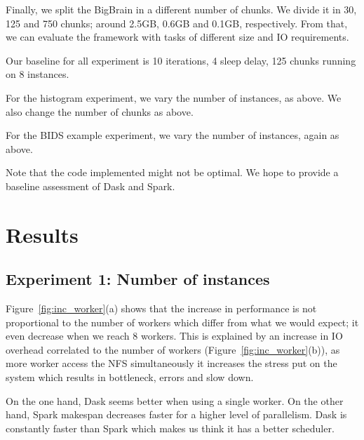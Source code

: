 \documentclass[conference]{IEEEtran}
\begin{document}
Finally, we split the BigBrain in a different number of chunks. We divide it in 30,
125 and 750 chunks; around 2.5GB, 0.6GB and 0.1GB, respectively. From that, we can
evaluate the framework with tasks of different size and IO requirements.

Our baseline for all experiment is 10 iterations, 4 sleep delay, 125 chunks running
on 8 instances.

For the histogram experiment, we vary the number of instances, as above. We also
change the number of chunks as above.

For the BIDS example experiment, we vary the number of instances, again as above.

Note that the code implemented might not be optimal. We hope to provide a baseline
assessment of Dask and Spark.


\section{Results}

\subsection{Experiment 1: Number of instances}
Figure~\ref{fig:inc_worker}(a) shows that the increase in performance is not
proportional to the number of workers which differ from what we would expect; it even
decrease when we reach 8 workers. This is explained by an increase in IO overhead
correlated to the number of workers (Figure~\ref{fig:inc_worker}(b)), as more worker
access the NFS simultaneously it increases the stress put on the system which results
in bottleneck, errors and slow down.

On the one hand, Dask seems better when using a single worker. On the other hand,
Spark makespan decreases faster for a higher level of parallelism. Dask is constantly
faster than Spark which makes us think it has a better scheduler.
\end{document}
